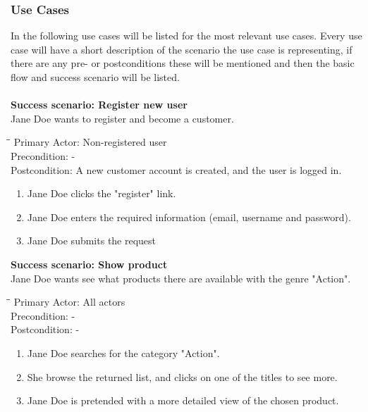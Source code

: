 \subsubsection{Use Cases}
In the following use cases will be listed for the most relevant use cases. Every use case will have a short description of the scenario the use case is representing, if there are any pre- or postconditions these will be mentioned and then the basic flow and success scenario will be listed.
\\\\

\textbf{Success scenario: Register new user} \\
Jane Doe wants to register and become a customer. 
\begin{tabbing}
\hspace{5mm}\=\hspace{28mm}\=\kill
\>Primary Actor:\> Non-registered user\\
\>Precondition:\> -\\
\>Postcondition:\> A new customer account is created, and the user is logged in.
\end{tabbing}
\begin{enumerate} \setlength{\itemsep}{-1mm}
	\item Jane Doe clicks the "register" link.
	\item Jane Doe enters the required information (email, username and password).
	\item Jane Doe submits the request
\end{enumerate}
\vspace{3mm}
\textbf{Success scenario: Show product} \\
Jane Doe wants see what products there are available with the genre "Action".
\begin{tabbing}
\hspace{5mm}\=\hspace{26mm}\=\kill
\>Primary Actor:\> All actors\\
\>Precondition:\> -\\
\>Postcondition:\> -
\end{tabbing}
\begin{enumerate} \setlength{\itemsep}{-1mm}
	\item Jane Doe searches for the category "Action".
	\item She browse the returned list, and clicks on one of the titles to see more.
	\item Jane Doe is pretended with a more detailed view of the chosen product.
\end{enumerate}
